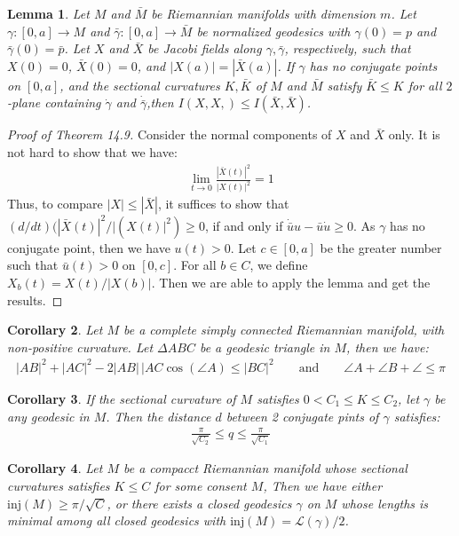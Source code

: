 \documentclass[11pt]{book}
\theoremstyle{break}
\theoremstyle{break}
\newtheorem{lem}{Lemma}[thm]
\newtheorem{corT}[lem]{Corollary}
\begin{document}
\begin{lem}
Let $M$ and $\bar{M}$ be Riemannian manifolds with dimension $m$. Let $\gamma:[0,a] \to M$ and $\bar{\gamma}:[0,a] \to \bar{M}$ be normalized geodesics with $\gamma(0) = p$ and $\bar{\gamma}(0) = \bar{p}$. Let $X$ and $\bar{X}$ be Jacobi fields along $\gamma,\bar{\gamma}$, respectively, such that $X(0) = 0$, $\bar{X}(0) = 0$, and $|X(a) | = |\bar{X}(a)|$. If $\gamma$ has no conjugate points on $[0,a]$, and the sectional curvatures $K,\bar{K}$ of $M$ and $\bar{M}$ satisfy $\bar{K}\leq K$ for all $2$-plane containing $\dot{\gamma}$ and $\dot{\bar{\gamma}}$,then $I(X,X,) \leq I(\bar{X},\bar{X})$.
\end{lem}

\begin{proof}[Proof of Theorem 14.9]
Consider the normal components of $X$ and $\bar{X}$ only. It is not hard to show that we have:
\begin{align*}
\lim_{t\to 0}\frac{|\bar{X}(t)|^2}{|X(t)|^2} = 1
\end{align*}
Thus, to compare $|X|\leq |\bar{X}|$, it suffices to show that $(d/dt)(|\bar{X}(t)|^2/ |(X(t)|^2 )\geq 0$, if and only if $\dot{\bar{u}}u - \bar{u}\dot{u} \geq 0$. As $\gamma$ has no conjugate point, then we have $u(t) >0$. Let $c \in [0,a]$ be the greater number such that $\bar{u}(t) >0$ on $[0,c]$. For all $b\in C$, we define $X_b(t)= X(t) / |X(b)|$. Then we are able to apply the lemma and get the results. 
\end{proof}


\begin{corT}
Let $M$ be a complete simply connected Riemannian manifold, with non-positive curvature. Let $\Delta ABC$ be a geodesic triangle in $M$, then we have: 
\begin{align*}
|AB|^2 + |AC|^2 - 2|AB|\, |AC\cos(\angle A )\leq |BC|^2\qquad\text{and}\qquad \angle A + \angle B+ \angle \leq \pi
\end{align*}
\end{corT}

\begin{corT}
If the sectional curvature of $M$ satisfies $0< C_1 \leq K \leq C_2$, let $\gamma$ be any geodesic in $M$. Then the distance $d$ between 2 conjugate pints of $\gamma$ satisfies:
\begin{align*}
\frac{\pi}{\sqrt{C_2} }\leq q \leq \frac{\pi}{\sqrt{C_1}}
\end{align*}
\end{corT}

\begin{corT}
Let $M$ be a compacct Riemannian manifold whose sectional curvatures satisfies $K \leq C$
 for some consent $M$, Then we have either $\text{inj}(M) \geq \pi/\sqrt{C}$, or there exists a closed geodesics $\gamma$ on $M$ whose lengths is minimal among all closed geodesics with $\text{inj}(M) = \mathcal{L}(\gamma)/2$. 
 \end{corT}
\end{document}
